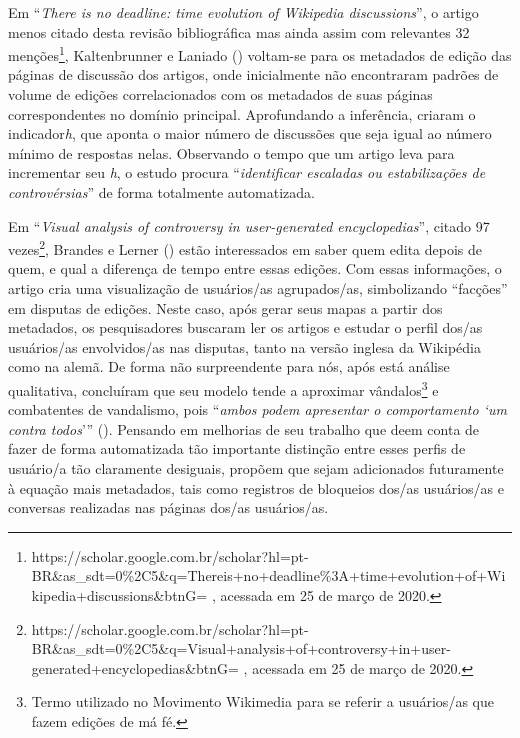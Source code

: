 Em “\textit{There is no deadline: time evolution of Wikipedia discussions}”, o artigo menos citado desta revisão bibliográfica mas ainda assim com relevantes 32 menções\footnote{https://scholar.google.com.br/scholar?hl=pt-BR\&as\_sdt=0\%2C5\&q=There\+is+no+deadline\%3A+time+evolution+of+Wikipedia+discussions\&btnG= , acessada em 25 de março de 2020.}, Kaltenbrunner e Laniado (\citeyear{laniado_emotions_2012}) voltam-se para os metadados de edição das páginas de discussão dos artigos, onde inicialmente não encontraram padrões de volume de edições correlacionados com os metadados de suas páginas correspondentes no domínio principal. Aprofundando a inferência, criaram o indicador\textit{h}, que aponta o maior número de discussões que seja igual ao número mínimo de respostas nelas. Observando o tempo que um artigo leva para incrementar seu \textit{h}, o estudo procura “\textit{identificar escaladas ou estabilizações de controvérsias}” de forma totalmente automatizada.

Em “\textit{Visual analysis of controversy in user-generated encyclopedias}”, citado 97 vezes\footnote{	https://scholar.google.com.br/scholar?hl=pt-BR\&as\_sdt=0\%2C5\&q=Visual+analysis+of+controversy+in+user-generated+encyclopedias\&btnG= , acessada em 25 de março de 2020.}, Brandes e Lerner (\citeyear{brandes_visual_2008}) estão interessados em saber quem edita depois de quem, e qual a diferença de tempo entre essas edições. Com essas informações, o artigo cria uma visualização de usuários/as agrupados/as, simbolizando “facções” em disputas de edições. Neste caso, após gerar seus mapas a partir dos metadados, os pesquisadores buscaram ler os artigos e estudar o perfil dos/as usuários/as envolvidos/as nas disputas, tanto na versão inglesa da Wikipédia como na alemã. De forma não surpreendente para nós, após está análise qualitativa, concluíram que seu modelo tende a aproximar vândalos\footnote{Termo utilizado no Movimento Wikimedia para se referir a usuários/as que fazem edições de má fé.} e combatentes de vandalismo, pois “\textit{ambos podem apresentar o comportamento ‘um contra todos}’” (\cite{brandes_visual_2008}). Pensando em melhorias de seu trabalho que deem conta de fazer de forma automatizada tão importante distinção entre esses perfis de usuário/a tão claramente desiguais, propõem que sejam adicionados futuramente à equação mais metadados, tais como registros de bloqueios dos/as usuários/as e conversas realizadas nas páginas dos/as usuários/as.

